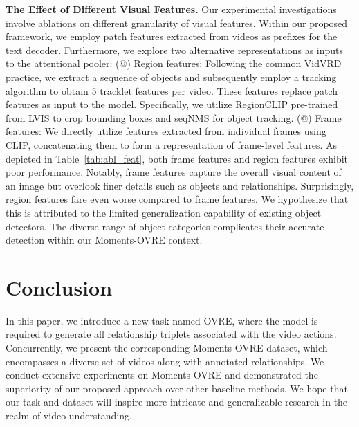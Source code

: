 \documentclass[letterpaper]{article}
\makeatletter
\newcommand{\Rmnum}[1]{\expandafter\@slowromancap\romannumeral #1@}
\makeatother
\begin{document}
\noindent \textbf{The Effect of Different Visual Features.}
Our experimental investigations involve ablations on different granularity of visual features. Within our proposed framework, we employ patch features extracted from videos as prefixes for the text decoder. Furthermore, we explore two alternative representations as inputs to the attentional pooler:
\vspace{-1.66mm}
\vspace{-4.97mm}
\vspace{-6.61mm}
(\Rmnum{1}) Region features: Following the common VidVRD practice, we extract a sequence of objects and subsequently employ a tracking algorithm to obtain 5 tracklet features per video. These features replace patch features as input to the model. Specifically, we utilize RegionCLIP \cite{zhong2021regionclip} pre-trained from LVIS to crop bounding boxes and seqNMS \cite{han2016seqnms} for object tracking.
(\Rmnum{2}) Frame features: We directly utilize features extracted from individual frames using CLIP, concatenating them to form a representation of frame-level features.
As depicted in Table~\ref{tab:abl_feat}, both frame features and region features exhibit poor performance. Notably, frame features capture the overall visual content of an image but overlook finer details such as objects and relationships. Surprisingly, region features fare even worse compared to frame features. We hypothesize that this is attributed to the limited generalization capability of existing object detectors. The diverse range of object categories complicates their accurate detection within our Moments-OVRE context.



\section{Conclusion}
In this paper, we introduce a new task named OVRE, where the model is required to generate all relationship triplets associated with the video actions. Concurrently, we present the corresponding Moments-OVRE dataset, which encompasses a diverse set of videos along with annotated relationships. We conduct extensive experiments on Moments-OVRE and demonstrated the superiority of our proposed approach over other baseline methods. We hope that our task and dataset will inspire more intricate and generalizable research in the realm of video understanding.

\hspace*{\fill}
\end{document}
